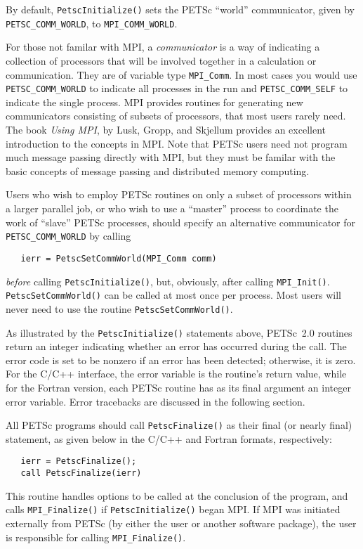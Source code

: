 By default, {\tt PetscInitialize()} sets the PETSc ``world''
communicator, given by {\tt PETSC\_COMM\_WORLD}, to {\tt MPI\_COMM\_WORLD}.

For those not familar with MPI, a {\em communicator} is a way of indicating
a collection of processors that will be involved together in a calculation
or communication. They are of variable type {\tt MPI\_Comm}. In most cases
you would use {\tt PETSC\_COMM\_WORLD} to indicate all processes in the 
run and {\tt PETSC\_COMM\_SELF} to indicate the single process. MPI provides
routines for generating new communicators consisting of subsets of processors,
that most users rarely need. The book {\em Using MPI}, by Lusk, Gropp, and Skjellum
\cite{using-mpi} provides an excellent introduction to the concepts in MPI. Note
that PETSc users need not program much message passing directly with MPI, but they
must be familar with the basic concepts of message passing and distributed 
memory computing.

Users who wish to employ PETSc routines on only a subset
of processors within a larger parallel job, or who wish to use a
``master'' process to coordinate the work of ``slave'' PETSc
processes, should specify an alternative communicator for {\tt
PETSC\_COMM\_WORLD} by calling 
\begin{verbatim}
   ierr = PetscSetCommWorld(MPI_Comm comm)
\end{verbatim}
{\em before} calling {\tt PetscInitialize()}, but, obviously, after
calling {\tt MPI\_Init()}. {\tt PetscSetCommWorld()} can be called
at most once per process. Most users will never need to use the routine
{\tt PetscSetCommWorld()}.

As illustrated by the {\tt PetscInitialize()} statements above,
PETSc~2.0 routines return an integer indicating whether an error has
occurred during the call.  The error code is set to be nonzero if an
error has been detected; otherwise, it is zero.  For the C/C++
interface, the error variable is the routine's return value, while for
the Fortran version, each PETSc routine has as its final argument an
integer error variable.  Error tracebacks are discussed in the following
section.

All PETSc programs should call {\tt PetscFinalize()} 
as their final (or nearly final) statement, as given below in the C/C++
and Fortran formats, respectively:
\begin{verbatim}
   ierr = PetscFinalize();
   call PetscFinalize(ierr)
\end{verbatim}
This routine handles options to be called at the conclusion of
the program, and calls {\tt MPI\_Finalize()} 
if {\tt PetscInitialize()}
began MPI. If MPI was initiated externally from PETSc (by either
the user or another software package), the user is
responsible for calling {\tt MPI\_Finalize()}. 

